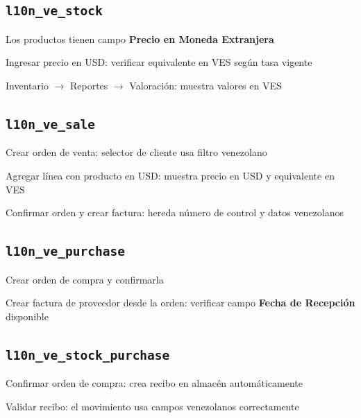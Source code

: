 \documentclass[11pt,a4paper]{article}
\newcommand{\modulo}[1]{\texttt{\textcolor{naranja}{#1}}}
\begin{document}
\begin{Form}
\subsection{\modulo{l10n\_ve\_stock}}

\begin{checklist}
  \item Los productos tienen campo \textbf{Precio en Moneda Extranjera}
  \item Ingresar precio en USD: verificar equivalente en VES según tasa vigente
  \item Inventario $\rightarrow$ Reportes $\rightarrow$ Valoración: muestra valores en VES
\end{checklist}

\subsection{\modulo{l10n\_ve\_sale}}

\begin{checklist}
  \item Crear orden de venta: selector de cliente usa filtro venezolano
  \item Agregar línea con producto en USD: muestra precio en USD y equivalente en VES
  \item Confirmar orden y crear factura: hereda número de control y datos venezolanos
\end{checklist}

\subsection{\modulo{l10n\_ve\_purchase}}

\begin{checklist}
  \item Crear orden de compra y confirmarla
  \item Crear factura de proveedor desde la orden: verificar campo \textbf{Fecha de Recepción} disponible
\end{checklist}

\subsection{\modulo{l10n\_ve\_stock\_purchase}}

\begin{checklist}
  \item Confirmar orden de compra: crea recibo en almacén automáticamente
  \item Validar recibo: el movimiento usa campos venezolanos correctamente
\end{checklist}


\end{Form}
\end{document}
